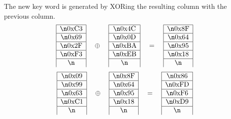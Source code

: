 The new key word is generated by XORing the resulting column with the previous column.
\[
        \begin{align*}
            & 
            \begin{array}{|c|}\hline\n\text{0xC3} \\ \hline\n\text{0x69} \\ \hline\n\text{0x2F} \\ \hline\n\text{0xF3} \\ \hline\n\end{array} 
            \quad \oplus \quad
            \begin{array}{|c|}\hline\n\text{0x4C} \\ \hline\n\text{0x0D} \\ \hline\n\text{0xBA} \\ \hline\n\text{0xEB} \\ \hline\n\end{array} 
            \quad = \quad
            \begin{array}{|c|}\hline\n\text{0x8F} \\ \hline\n\text{0x64} \\ \hline\n\text{0x95} \\ \hline\n\text{0x18} \\ \hline\n\end{array}
        \end{align*}
        \]\[
        \begin{align*}
            & 
            \begin{array}{|c|}\hline\n\text{0x09} \\ \hline\n\text{0x99} \\ \hline\n\text{0x63} \\ \hline\n\text{0xC1} \\ \hline\n\end{array} 
            \quad \oplus \quad
            \begin{array}{|c|}\hline\n\text{0x8F} \\ \hline\n\text{0x64} \\ \hline\n\text{0x95} \\ \hline\n\text{0x18} \\ \hline\n\end{array} 
            \quad = \quad
            \begin{array}{|c|}\hline\n\text{0x86} \\ \hline\n\text{0xFD} \\ \hline\n\text{0xF6} \\ \hline\n\text{0xD9} \\ \hline\n\end{array}

\end{align*}\]
